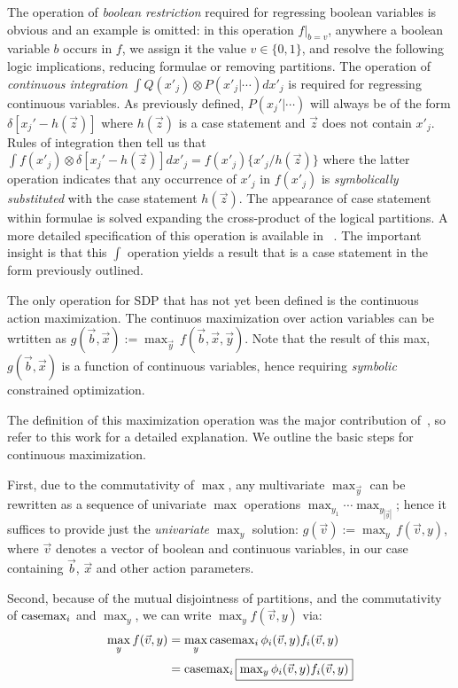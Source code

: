  The operation of \emph{boolean restriction} required for regressing boolean variables is obvious and an example is omitted: in this operation
$f|_{b=v}$, anywhere a boolean variable $b$ occurs in $f$, we assign
it the value $v \in \{ 0,1 \}$, and resolve the following logic implications, reducing formulae or removing partitions.  The operation of \emph{continuous integration} $\int Q(x'_j) \otimes P(x'_j|\cdots) dx'_j$ is required for regressing continuous variables. As previously defined, $P(x_j'|\cdots)$
will always be of the form $\delta[x_j' - h(\vec{z})]$ where
$h(\vec{z})$ is a case statement and $\vec{z}$ does not contain
$x'_j$.  Rules of integration then tell us that $\int f(x'_j) \otimes
\delta[x_j' - h(\vec{z})] dx'_j = f(x'_j) \{ x'_j / h(\vec{z}) \}$
where the latter operation indicates that any occurrence of $x'_j$ in
$f(x'_j)$ is \emph{symbolically substituted} with the case statement
$h(\vec{z})$. The appearance of case statement within formulae is solved expanding the cross-product of the logical partitions. A more detailed specification of this operation is available in ~\cite{sanner_uai11}.  The important insight is that this $\int$ operation yields a result that is a
case statement in the form previously outlined.

The only operation for SDP that has not yet been defined is the continuous action maximization.
The continuos maximization over action variables can be wrtitten as $g(\vec{b},\vec{x}) := \max_{\vec{y}} \, f(\vec{b},\vec{x},\vec{y})$. Note that the result of this max, $g(\vec{b},\vec{x})$ is a function of continuous variables, hence requiring \emph{symbolic} constrained optimization.

The definition of this maximization operation was the major contribution of~\cite{zamani12}, so refer to this work for a detailed explanation. We outline the basic steps for continuous maximization.

First, due to the commutativity of $\max$, any multivariate $\max_{\vec{y}}$ can be rewritten as a sequence of univariate $\max$ operations $\max_{y_1} \cdots \max_{y_{|\vec{y}|}}$; hence it
suffices to provide just the \emph{univariate} $\max_y$ solution:
$g(\vec{v}) := \max_{y} \, f(\vec{v},y)$, where $\vec{v}$ denotes a vector of boolean and continuous variables, in our case containing $\vec{b}$, $\vec{x}$ and other action parameters.

Second, because of the mutual disjointness of partitions, and the commutativity of $\mathrm{casemax}_i$ and $\max_y$, we can write $\max_y f(\vec{v},y) $ via:
{\footnotesize
\begin{align}
\max_y f(\vec{v},y) & = 
\max_y \mathrm{casemax}_i \, \phi_i(\vec{v},y) f_i(\vec{v},y) \nonumber \\
& = \mathrm{casemax}_i \, \fbox{$\max_y \phi_i(\vec{v},y) f_i(\vec{v},y)$} \label{eq:casemax_max}
\end{align}}

